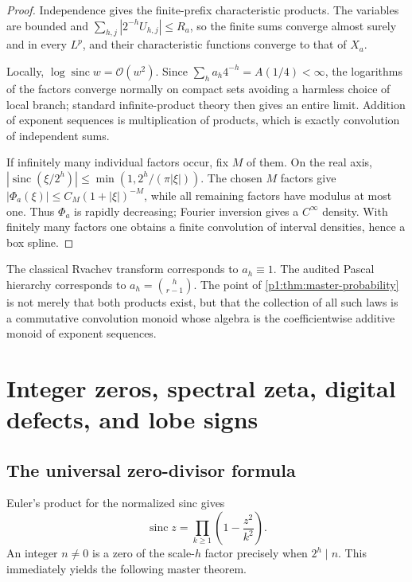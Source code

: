 \documentclass[11pt,oneside]{article}
\numberwithin{equation}{section}
\theoremstyle{definition}
\theoremstyle{remark}
\newcommand{\sinc}{\operatorname{sinc}}
\newcommand{\bigO}{\mathcal O}
\begin{document}
\begin{proof}
Independence gives the finite-prefix characteristic products.  The variables are bounded and
$\sum_{h,j}|2^{-h}U_{h,j}|\le R_a$, so the finite sums converge almost surely and in every
$L^p$, and their characteristic functions converge to that of $X_a$.

Locally, $\log\sinc w=\bigO(w^2)$.  Since
$\sum_ha_h4^{-h}=A(1/4)<\infty$, the logarithms of the factors converge normally on compact
sets avoiding a harmless choice of local branch; standard infinite-product theory then gives
an entire limit.  Addition of exponent sequences is multiplication of products, which is
exactly convolution of independent sums.

If infinitely many individual factors occur, fix $M$ of them.  On the real axis,
$|\sinc(\xi/2^h)|\le\min(1,2^h/(\pi|\xi|))$.  The chosen $M$ factors give
$|\Phi_a(\xi)|\le C_M(1+|\xi|)^{-M}$, while all remaining factors have modulus at most one.
Thus $\Phi_a$ is rapidly decreasing; Fourier inversion gives a $C^\infty$ density.  With
finitely many factors one obtains a finite convolution of interval densities, hence a box
spline.
\end{proof}

\begin{remark}
The classical Rvachev transform corresponds to $a_h\equiv1$.  The audited Pascal hierarchy
corresponds to $a_h=\binom h{r-1}$.  The point of \cref{p1:thm:master-probability} is not merely
that both products exist, but that the collection of all such laws is a commutative
convolution monoid whose algebra is the coefficientwise additive monoid of exponent
sequences.
\end{remark}

\section{Integer zeros, spectral zeta, digital defects, and lobe signs}
\label{p1:sec:spectrum}

\subsection{The universal zero-divisor formula}

Euler's product for the normalized sinc gives
\[
 \sinc z=\prod_{k\ge1}\left(1-\frac{z^2}{k^2}\right).
\]
An integer $n\ne0$ is a zero of the scale-$h$ factor precisely when $2^h\mid n$.
This immediately yields the following master theorem.
\end{document}

